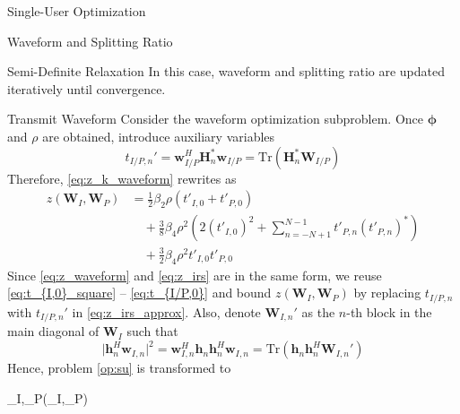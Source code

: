 \documentclass{IEEEtran}
\begin{document}
\begin{section}{Single-User Optimization}
\begin{subsection}{Waveform and Splitting Ratio}
		\begin{subsubsection}{Semi-Definite Relaxation}
			In this case, waveform and splitting ratio are updated iteratively until convergence.
			\begin{paragraph}{Transmit Waveform}
				Consider the waveform optimization subproblem. Once $\boldsymbol{\phi}$ and $\rho$ are obtained, introduce auxiliary variables
				\begin{equation}\label{eq:t'}
					t_{I/P,n}' = \boldsymbol{w}_{I/P}^H \boldsymbol{H}_n^* \boldsymbol{w}_{I/P} = \mathrm{Tr}(\boldsymbol{H}_n^*\boldsymbol{W}_{I/P})
				\end{equation}
				Therefore, \ref{eq:z_k_waveform} rewrites as
				\begin{equation}\label{eq:z_waveform}
					\begin{split}
						z(\boldsymbol{W}_I,\boldsymbol{W}_P)
						&=\frac{1}{2} \beta_2 \rho (t'_{I,0}+t'_{P,0})\\
						&\quad+\frac{3}{8} \beta_4 \rho^2 \left(2(t'_{I,0})^2 + \sum_{n=-N+1}^{N-1}{t'_{P,n}(t'_{P,n})^*}\right)\\
						&\quad+\frac{3}{2} \beta_4 \rho^2 t'_{I,0}t'_{P,0}
					\end{split}
				\end{equation}
				Since \ref{eq:z_waveform} and \ref{eq:z_irs} are in the same form, we reuse \ref{eq:t_{I,0}_square} -- \ref{eq:t_{I/P,0}} and bound $z(\boldsymbol{W}_I,\boldsymbol{W}_P)$ by replacing $t_{I/P,n}$ with $t_{I/P,n}'$ in \ref{eq:z_irs_approx}. Also, denote $\boldsymbol{W}_{I,n}'$ as the $n$-th block in the main diagonal of $\boldsymbol{W}_{I}$ such that
				\begin{equation}
					\lvert{\boldsymbol{h}_n^H\boldsymbol{w}_{I,n}}\rvert^2=\boldsymbol{w}_{I,n}^H\boldsymbol{h}_n\boldsymbol{h}_n^H\boldsymbol{w}_{I,n}=\mathrm{Tr}(\boldsymbol{h}_n\boldsymbol{h}_n^H\boldsymbol{W}_{I,n}')
				\end{equation}
				Hence, problem \ref{op:su} is transformed to
				\begin{maxi!}
					{\boldsymbol{W}_I,_P}{(_I,_P)}{\label{op:su_waveform}}{\label{eq:su_waveform_target}}

\end{maxi!}
\end{paragraph}
\end{subsubsection}
\end{subsection}
\end{section}
\end{document}
